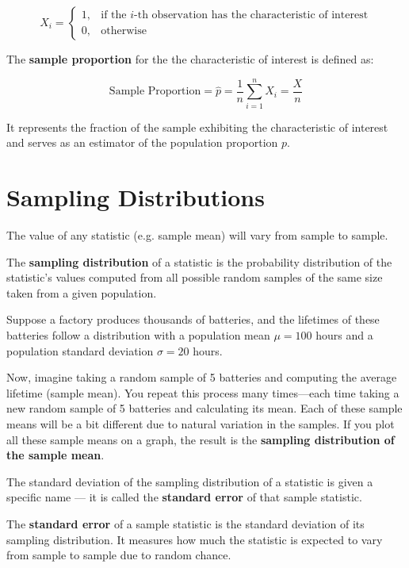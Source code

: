 \documentclass[twoside]{book}
\begin{document}
\[
X_i = \begin{cases}
1, & \text{if the } i\text{-th observation has the characteristic of interest} \\
0, & \text{otherwise}
\end{cases}
\]

The \textbf{sample proportion} for the the characteristic of interest is defined as:
\begin{textbox}
\[
\text{Sample Proportion} = \hat{p} = \frac{1}{n} \sum_{i=1}^n X_i = \frac{X}{n}
\]
\end{textbox}

It represents the fraction of the sample exhibiting the characteristic of interest and serves as an estimator of the population proportion \( p \).



\section{Sampling Distributions}
The value of any statistic (e.g. sample mean) will vary from sample to sample.
\begin{textbox}
The \textbf{sampling distribution} of a statistic is the probability distribution of the statistic's values computed from all possible random samples of the same size taken from a given population.
\end{textbox}

Suppose a factory produces thousands of batteries, and the lifetimes of these batteries follow a distribution with a population mean \( \mu = 100 \) hours and a population standard deviation \( \sigma = 20 \) hours.

Now, imagine taking a random sample of 5 batteries and computing the average lifetime (sample mean). You repeat this process many times—each time taking a new random sample of 5 batteries and calculating its mean. Each of these sample means will be a bit different due to natural variation in the samples. If you plot all these sample means on a graph, the result is the \textbf{sampling distribution of the sample mean}.

The standard deviation of the sampling distribution of a statistic is given a specific name — it is called the \textbf{standard error} of that sample statistic.

\begin{textbox}
The \textbf{standard error} of a sample statistic is the standard deviation of its sampling distribution. It measures how much the statistic is expected to vary from sample to sample due to random chance.
\end{textbox}
\end{document}
